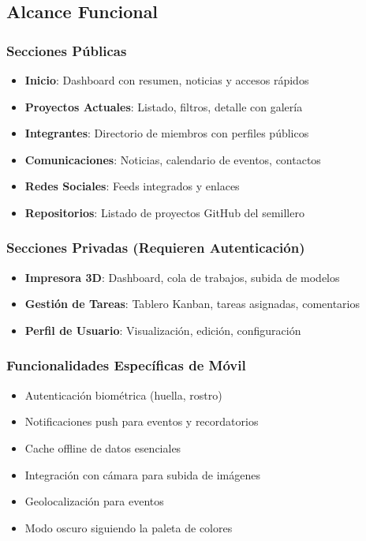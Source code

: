 \documentclass[12pt]{article}
\begin{document}
\subsection{Alcance Funcional}

\subsubsection{Secciones Públicas}
\begin{itemize}
    \item \textbf{Inicio}: Dashboard con resumen, noticias y accesos rápidos
    \item \textbf{Proyectos Actuales}: Listado, filtros, detalle con galería
    \item \textbf{Integrantes}: Directorio de miembros con perfiles públicos
    \item \textbf{Comunicaciones}: Noticias, calendario de eventos, contactos
    \item \textbf{Redes Sociales}: Feeds integrados y enlaces
    \item \textbf{Repositorios}: Listado de proyectos GitHub del semillero
\end{itemize}

\subsubsection{Secciones Privadas (Requieren Autenticación)}
\begin{itemize}
    \item \textbf{Impresora 3D}: Dashboard, cola de trabajos, subida de modelos
    \item \textbf{Gestión de Tareas}: Tablero Kanban, tareas asignadas, comentarios
    \item \textbf{Perfil de Usuario}: Visualización, edición, configuración
\end{itemize}

\subsubsection{Funcionalidades Específicas de Móvil}
\begin{itemize}
    \item Autenticación biométrica (huella, rostro)
    \item Notificaciones push para eventos y recordatorios
    \item Cache offline de datos esenciales
    \item Integración con cámara para subida de imágenes
    \item Geolocalización para eventos
    \item Modo oscuro siguiendo la paleta de colores
\end{itemize}
\end{document}

